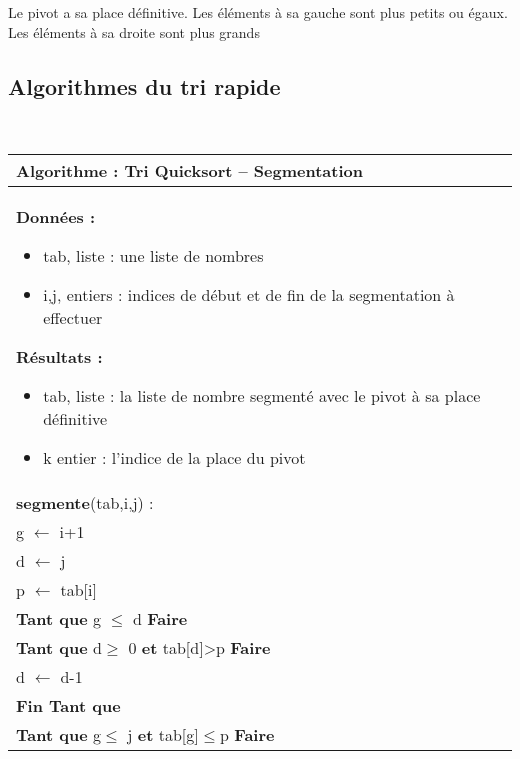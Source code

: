 \documentclass[10pt,fleqn]{article} %
\begin{document}
Le pivot a sa place définitive. Les éléments à sa gauche sont plus petits ou égaux.
Les éléments à sa droite sont plus grands

\subsection{Algorithmes du tri rapide}


\begin{pseudo}
~\\
\begin{tabular}{p{}}
\hline
\textbf{Algorithme :} Tri Quicksort -- Segmentation\\
\hline
\textbf{Données :}
\begin{itemize}
\item \textsf{tab}, liste : une liste de nombres
\item \textsf{i,j}, entiers : indices de début et de fin de la segmentation à effectuer
\end{itemize}
\textbf{Résultats :} 
\begin{itemize}
\item \textsf{tab}, liste : la liste de nombre segmenté avec le pivot à sa place définitive
\item \textsf{k} entier : l'indice de la place du pivot
\end{itemize}
\\
\textbf{segmente}(\textsf{tab,i,j}) :\\
\hspace{.4cm} \textsf{g $\leftarrow$ i+1 }\\
\hspace{.4cm} \textsf{d $\leftarrow$ j}\\
\hspace{.4cm} \textsf{p $\leftarrow$ tab[i]}\\
\hspace{.4cm} \textbf{Tant que} \textsf{g $\leq$ d} \textbf{Faire} \\
\hspace{.8cm} \textbf{Tant que} \textsf{d$\geq$ 0} \textbf{et} \textsf{tab[d]>p} \textbf{Faire} \\
\hspace{1.2cm} \textsf{d $\leftarrow$ d-1}\\  
\hspace{.8cm} \textbf{Fin Tant que}  \\
\hspace{.8cm} \textbf{Tant que} \textsf{g$\leq$ j} \textbf{et} \textsf{tab[g]$\leq$p} \textbf{Faire} \\

\end{tabular}
\end{pseudo}
\end{document}
